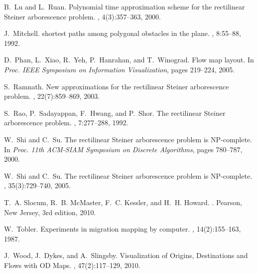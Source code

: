 \documentclass{journalA4}
\begin{document}
\begin{thebibliography}{21}
B.~Lu and L.~Ruan.
\newblock Polynomial time approximation scheme for the rectilinear {Steiner}
  arborescence problem.
, 4(3):357--363, 2000.

J.~Mitchell.
\newblock {} shortest paths among polygonal obstacles in the plane.
, 8:55--88, 1992.

D.~Phan, L.~Xiao, R.~Yeh, P.~Hanrahan, and T.~Winograd.
\newblock Flow map layout.
\newblock In {\em Proc. IEEE Symposium on Information Visualization}, pages
  219--224, 2005.

S.~Ramnath.
\newblock New approximations for the rectilinear {Steiner} arborescence
  problem.
, 22(7):859--869, 2003.

S.~Rao, P.~Sadayappan, F.~Hwang, and P.~Shor.
\newblock The rectilinear {Steiner} arborescence problem.
, 7:277--288, 1992.

W.~Shi and C.~Su.
\newblock The rectilinear {Steiner} arborescence problem is {NP}-complete.
\newblock In {\em Proc. 11th ACM-SIAM Symposium on Discrete Algorithms}, pages
  780--787, 2000.

W.~Shi and C.~Su.
\newblock The rectilinear {Steiner} arborescence problem is {NP}-complete.
, 35(3):729--740, 2005.

T.~A. Slocum, R.~B. McMaster, F.~C. Kessler, and H.~H. Howard.
.
\newblock Pearson, New Jersey, 3rd edition, 2010.

W.~Tobler.
\newblock Experiments in migration mapping by computer.
, 14(2):155--163, 1987.

J.~Wood, J.~Dykes, and A.~Slingsby.
\newblock Visualization of Origins, Destinations and Flows with {OD} Maps.
, 47(2):117--129, 2010.

\end{thebibliography}
\end{document}
